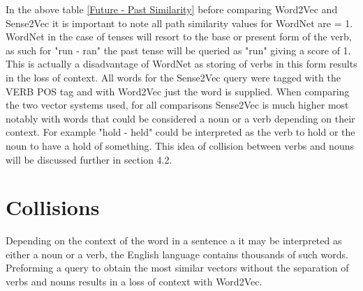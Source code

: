 \noindent
In the above table \ref{Future - Past Similarity} before comparing Word2Vec and Sense2Vec it is important to note all path similarity values for WordNet are = 1. WordNet in the case of tenses will resort to the base or present form of the verb, as such for "run - ran" the past tense will be queried as "run" giving a score of 1. This is actually a disadvantage of WordNet as storing of verbs in this form results in the loss of context. All words for the Sense2Vec query were tagged with the VERB POS tag and with Word2Vec just the word is supplied. When comparing the two vector systems used, for all comparisons Sense2Vec is much higher most notably with words that could be considered a noun or a verb depending on their context. For example "hold - held" could be interpreted as the verb to hold or the noun to have a hold of something. This idea of collision between verbs and nouns will be discussed further in section 4.2.

\section{Collisions}
Depending on the context of the word in a sentence a it may be interpreted as either a noun or a verb, the English language contains thousands of such words. Preforming a query to obtain the most similar vectors without the separation of verbs and nouns results in a loss of context with Word2Vec.

